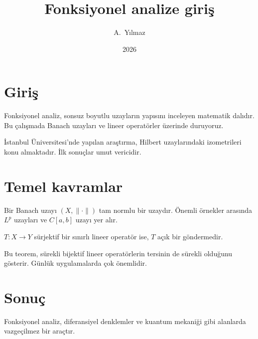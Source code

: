 \documentclass{article}
\title{Fonksiyonel analize giri\c{s}}
\author{A.~Y{\i}lmaz}
\date{2026}
\begin{document}
\maketitle

\section{Giri\c{s}}

Fonksiyonel analiz, sonsuz boyutlu uzaylar{\i}n yap{\i}s{\i}n{\i} inceleyen
matematik dal{\i}d{\i}r.  Bu \c{c}al{\i}\c{s}mada Banach uzaylar{\i} ve
lineer operat\"orler \"uzerinde duruyoruz.

\.{I}stanbul \"Universitesi'nde yap{\i}lan ara\c{s}t{\i}rma, Hilbert
uzaylar{\i}ndaki izometrileri konu almaktad{\i}r.  \.{I}lk sonu\c{c}lar
umut vericidir.

\section{Temel kavramlar}

Bir Banach uzay{\i} $(X, \|\cdot\|)$ tam normlu bir uzayd{\i}r.
\"Onemli \"ornekler aras{\i}nda $L^p$ uzaylar{\i} ve $C[a,b]$ uzay{\i}
yer al{\i}r.

\begin{theorem}
$T \colon X \to Y$ s\"urjektif bir s{\i}n{\i}rl{\i} lineer operat\"or ise,
$T$ a\c{c}{\i}k bir g\"ondermedir.
\end{theorem}

Bu teorem, s\"urekli bijektif lineer operat\"orlerin tersinin de s\"urekli
oldu\u{g}unu g\"osterir.  G\"unl\"uk uygulamalarda \c{c}ok \"onemlidir.

\section{Sonu\c{c}}

Fonksiyonel analiz, diferansiyel denklemler ve kuantum mekani\u{g}i gibi
alanlarda vazge\c{c}ilmez bir ara\c{c}t{\i}r.
\end{document}
